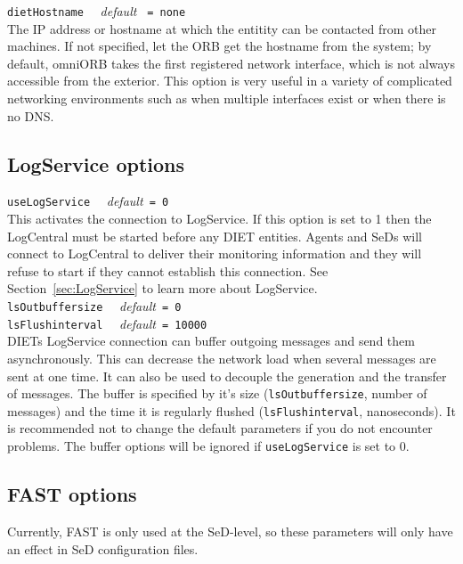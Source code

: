 \noindent
\texttt{dietHostname} \ \ \emph{default} \texttt{ = none }\\
The IP address or hostname at which the entitity can be contacted
from other machines. If not specified, let the
ORB get the hostname from the system; by default, omniORB takes the
first registered network interface, which is not always accessible
from the exterior.  This option is very useful in a variety of
complicated networking environments such as when multiple interfaces
exist or when there is no DNS.

\subsection{LogService options}

\noindent
\texttt{useLogService} \ \ \emph{default}\texttt{ = 0}\\ This
activates the connection to LogService. 
If
this option is set to 1 then the LogCentral must be started before any
DIET entities. Agents and SeDs will connect to LogCentral to deliver
their monitoring information and they will refuse to start if they
cannot establish this connection. See Section~\ref{sec:LogService} 
to learn more about LogService.\\

\noindent
\texttt{lsOutbuffersize} \ \ \emph{default}\texttt{ = 0}\\
\noindent
\texttt{lsFlushinterval} \ \ \emph{default}\texttt{ = 10000}\\ DIETs
LogService connection can buffer outgoing messages and send them
asynchronously. This can decrease the network load when
several messages are sent at one time. It can also be used to decouple
the generation and the transfer of messages.  The buffer is specified
by it's size (\texttt{lsOutbuffersize}, number of messages) and the
time it is regularly flushed (\texttt{lsFlushinterval},
nanoseconds). It is recommended not to change the default parameters
if you do not encounter problems. The buffer options will be ignored
if \texttt{useLogService} is set to 0.


\subsection{FAST options}

\noindent
Currently, FAST is only used at the SeD-level, so these parameters
will only have an effect in SeD configuration files.\\

